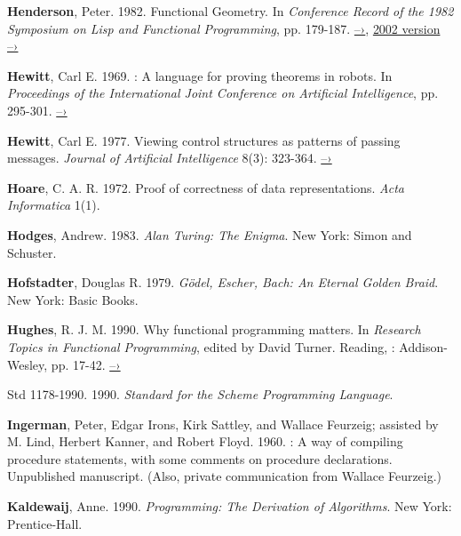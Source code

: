  \label{Henderson 1982}
\textbf{Henderson}, Peter. 1982. Functional Geometry. In \textit{Conference Record of the
1982  Symposium on Lisp and Functional Programming}, pp. 179-187.
\href{http://pmh-systems.co.uk/phAcademic/papers/funcgeo.pdf}{–›},
\href{http://eprints.soton.ac.uk/257577/1/funcgeo2.pdf}{2002 version –›}

 \label{Hewitt (1969)}
\textbf{Hewitt}, Carl E.  1969.  : A language for proving
theorems in robots.  In \textit{Proceedings of the International Joint
Conference on Artificial Intelligence}, pp. 295-301.
\href{http://dspace.mit.edu/handle/1721.1/6171}{–›}

 \label{Hewitt (1977)}
\textbf{Hewitt}, Carl E.  1977.  Viewing control structures as patterns of passing
messages.  \textit{Journal of Artificial Intelligence} 8(3): 323-364.
\href{http://dspace.mit.edu/handle/1721.1/6272}{–›}

 \label{Hoare (1972)}
\textbf{Hoare}, C. A. R. 1972.  Proof of correctness of data representations.
\textit{Acta Informatica} 1(1).

 \label{Hodges 1983}
\textbf{Hodges}, Andrew. 1983.  \textit{Alan Turing: The Enigma}. New York: Simon and
Schuster.

 \label{Hofstadter 1979}
\textbf{Hofstadter}, Douglas R.  1979.  \textit{G\"odel, Escher, Bach: An Eternal Golden
Braid}. New York: Basic Books.

 \label{Hughes 1990}
\textbf{Hughes}, R. J. M.  1990.  Why functional programming matters.  In \textit{Research
Topics in Functional Programming}, edited by David Turner.  Reading, :
Addison-Wesley, pp. 17-42.
\href{http://www.cs.kent.ac.uk/people/staff/dat/miranda/whyfp90.pdf}{–›}

 \label{IEEE 1990}
 Std 1178-1990.  1990.  \textit{ Standard for the
Scheme Programming Language}.

\enlargethispage{\baselineskip}

 \label{Ingerman et al. 1960}
\textbf{Ingerman}, Peter, Edgar Irons, Kirk Sattley, and Wallace Feurzeig; assisted by
M. Lind, Herbert Kanner, and Robert Floyd.  1960.  : A way of
compiling procedure statements, with some comments on procedure declarations.
Unpublished manuscript.  (Also, private communication from Wallace Feurzeig.)

 \label{Kaldewaij 1990}
\textbf{Kaldewaij}, Anne. 1990.  \textit{Programming: The Derivation of Algorithms}. New
York: Prentice-Hall.

